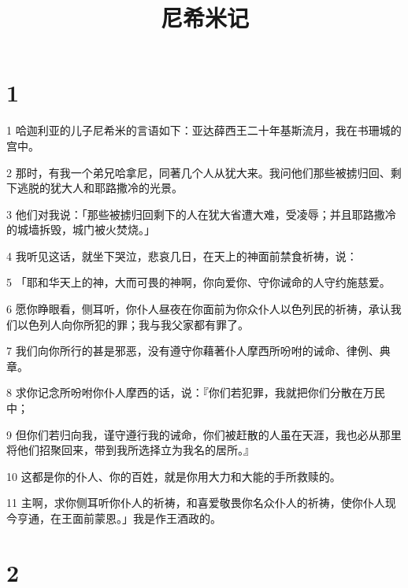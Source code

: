 

\title{尼希米记}


\chapter{1}

\par 1 哈迦利亚的儿子尼希米的言语如下：亚达薛西王二十年基斯流月，我在书珊城的宫中。
\par 2 那时，有我一个弟兄哈拿尼，同著几个人从犹大来。我问他们那些被掳归回、剩下逃脱的犹大人和耶路撒冷的光景。
\par 3 他们对我说：「那些被掳归回剩下的人在犹大省遭大难，受凌辱；并且耶路撒冷的城墙拆毁，城门被火焚烧。」
\par 4 我听见这话，就坐下哭泣，悲哀几日，在天上的神面前禁食祈祷，说：
\par 5 「耶和华天上的神，大而可畏的神啊，你向爱你、守你诫命的人守约施慈爱。
\par 6 愿你睁眼看，侧耳听，你仆人昼夜在你面前为你众仆人以色列民的祈祷，承认我们以色列人向你所犯的罪；我与我父家都有罪了。
\par 7 我们向你所行的甚是邪恶，没有遵守你藉著仆人摩西所吩咐的诫命、律例、典章。
\par 8 求你记念所吩咐你仆人摩西的话，说：『你们若犯罪，我就把你们分散在万民中；
\par 9 但你们若归向我，谨守遵行我的诫命，你们被赶散的人虽在天涯，我也必从那里将他们招聚回来，带到我所选择立为我名的居所。』
\par 10 这都是你的仆人、你的百姓，就是你用大力和大能的手所救赎的。
\par 11 主啊，求你侧耳听你仆人的祈祷，和喜爱敬畏你名众仆人的祈祷，使你仆人现今亨通，在王面前蒙恩。」我是作王酒政的。

\chapter{2}

